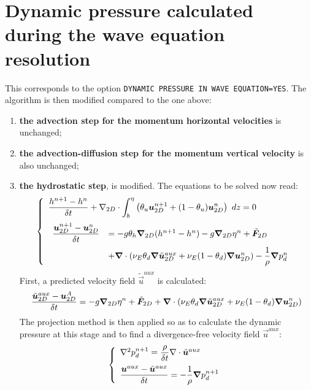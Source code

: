 \section{Dynamic pressure calculated during the wave equation
resolution}\label{sec:dynamicpressureinwaveequation}
This corresponds to the option \texttt{DYNAMIC PRESSURE IN WAVE EQUATION=YES}.
The algorithm is then modified compared to the one above:
\begin{enumerate}
\item \textbf{the advection step for the momentum horizontal velocities} is unchanged;
\item \textbf{the advection-diffusion step for the momentum vertical velocity}
is also unchanged;
\item \textbf{the hydrostatic step}, is modified. The equations to be solved
now read:
\begin{equation}\label{eq:hydrostatic_third_system}
  \left\{\begin{array}{l}
    \dfrac{h^{n+1}-h^{n}}{\delta t} 
    + \nabla_{2D}\cdot \displaystyle{\int_b^\eta\left(\theta_u\vec{u}_{2D}^{n+1}+(1-\theta_u)\vec{u}_{2D}^n\right)~dz}=0 \medskip \\
    \begin{array}{ll}\dfrac{\vec{u}_{2D}^{n+1}-\vec{u}_{2D}^{n}}{\delta t}&=-g \theta_h \Grad_{2D}(h^{n+1}-h^n) -g\Grad_{2D}\eta^n
     + \tilde{\vec{F}}_{2D}\medskip \\
     &+\BDiv(\nu_E \theta_d\Grad \tilde{\vec{u}}_{2D}^{aux}+\nu_E(1-\theta_d)\Grad \vec{u}_{2D}^{n})
     -\dfrac{1}{\rho}\Grad p_d^n
  \end{array}
\end{array}\right.
\end{equation}
First, a predicted velocity field $\tilde{\vec{u}}^{aux}$ is calculated:
\begin{equation}
  \dfrac{\tilde{\bm{u}}_{2D}^{aux}-\bm{u}_{2D}^{A}}{\delta t}= -g\bm{\nabla}_{2D}\eta^n
     + \tilde{\bm{F}}_{2D}
     +\bm{\nabla} \cdot(\nu_E \theta_d\bm{\nabla} \tilde{\bm{u}}_{2D}^{aux}+\nu_E(1-\theta_d)\bm{\nabla} \bm{u}_{2D}^{n})
\end{equation}
The projection method is then applied so as to calculate the dynamic pressure 
at this stage and to find a divergence-free velocity field $\vec{u}^{aux}$:
\begin{equation}
  \left\{\begin{array}{l}
    \Lap p_d^{n+1} = \dfrac{\rho}{\delta t}\Div \tilde{\vec{u}}^{aux} \medskip \\
    \dfrac{\vec{u}^{aux}-\tilde{\vec{u}}^{aux}}{\delta t} = -\dfrac{1}{\rho}\Grad p_d^{n+1}
  \end{array}\right.
\end{equation}


\end{enumerate}
